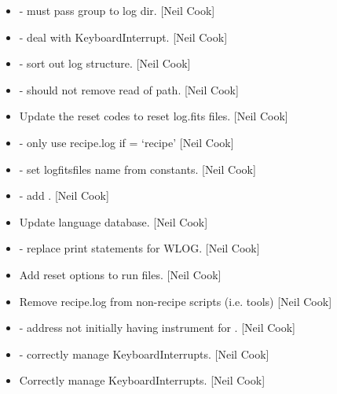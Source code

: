 \documentclass[a4paper,10pt,english]{report}
\begin{document}
\begin{itemize}
\item {} 
 - must pass group to log dir. {[}Neil Cook{]}

\item {} 
 - deal with KeyboardInterrupt.
{[}Neil Cook{]}

\item {} 
 - sort out log structure. {[}Neil Cook{]}

\item {} 
 - should not remove read of path. {[}Neil Cook{]}

\item {} 
Update the reset codes to reset log.fits files. {[}Neil Cook{]}

\item {} 
 - only use recipe.log if  =
‘recipe’ {[}Neil Cook{]}

\item {} 
 - set logfitsfiles name from constants. {[}Neil
Cook{]}

\item {} 
 - add .
{[}Neil Cook{]}

\item {} 
Update language database. {[}Neil Cook{]}

\item {} 
 - replace print statements for WLOG. {[}Neil Cook{]}

\item {} 
Add reset options to run files. {[}Neil Cook{]}

\item {} 
Remove recipe.log from non-recipe scripts (i.e. tools) {[}Neil Cook{]}

\item {} 
 - address not initially having instrument for
. {[}Neil Cook{]}

\item {} 
 - correctly manage KeyboardInterrupts. {[}Neil
Cook{]}

\item {} 
Correctly manage KeyboardInterrupts. {[}Neil Cook{]}


\end{itemize}
\end{document}
